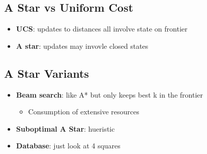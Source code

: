   \subsection{A Star vs Uniform Cost}

    \begin{itemize}
      \item \textbf{UCS}: updates to distances all involve state on frontier
      \item \textbf{A star}: updates may invovle closed states
    \end{itemize}

  \subsection{A Star Variants}

    \begin{itemize}
      \item \textbf{Beam search}: like A* but only keeps best k in the frontier
      \begin{itemize}
        \item Consumption of extensive resources
      \end{itemize}

      \item \textbf{Suboptimal A Star}: hueristic
      \item \textbf{Database}: just look at 4 squares
    \end{itemize}
